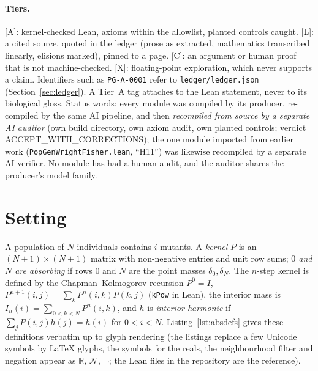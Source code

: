 \documentclass[11pt]{article}
\theoremstyle{remark}
\newcommand{\tier}[1]{\textsf{[#1]}}
\newcommand{\lean}[1]{\texttt{#1}}
\begin{document}
\paragraph{Tiers.} \tier{A}: kernel-checked Lean, axioms within the allowlist, planted controls caught.
\tier{L}: a cited source, quoted in the ledger (prose as extracted, mathematics transcribed linearly, elisions marked),
pinned to a page. \tier{C}: an argument or human proof that is not machine-checked. \tier{X}: floating-point
exploration, which never supports a claim. Identifiers such as \texttt{PG-A-0001} refer to \texttt{ledger/ledger.json}
(Section~\ref{sec:ledger}). A Tier~A tag attaches to the Lean statement, never to its biological gloss. Status words:
every module was compiled by its producer, re-compiled by the same AI pipeline, and then \emph{recompiled from source by a
separate AI auditor} (own build directory, own axiom audit, own planted controls; verdict ACCEPT\_WITH\_CORRECTIONS); the one module
imported from earlier work (\texttt{PopGenWrightFisher.lean}, ``H11'') was likewise recompiled by a separate AI verifier. No module has
had a human audit, and the auditor shares the producer's model family.

\section{Setting}\label{sec:setting}
A population of $N$ individuals contains $i$ mutants. A \emph{kernel} $P$ is an $(N+1)\times(N+1)$ matrix with
non-negative entries and unit row sums; \emph{$0$ and $N$ are absorbing} if rows $0$ and $N$ are the point masses
$\delta_0,\delta_N$. The $n$-step kernel is defined by the Chapman--Kolmogorov recursion
$P^{0}=I$, $P^{n+1}(i,j)=\sum_k P^{n}(i,k)P(k,j)$ (\lean{kPow} in Lean), the interior mass is
$I_n(i)=\sum_{0<k<N}P^{n}(i,k)$, and $h$ is \emph{interior-harmonic} if $\sum_jP(i,j)h(j)=h(i)$ for $0<i<N$.
Listing~\ref{lst:absdefs} gives these definitions verbatim up to glyph rendering (the listings replace a few Unicode symbols by \LaTeX{} glyphs, the symbols for the reals, the neighbourhood filter and negation appear as $\mathbb{R}$, $\mathcal N$, $\neg$; the Lean files in the repository are the reference).


\end{document}
